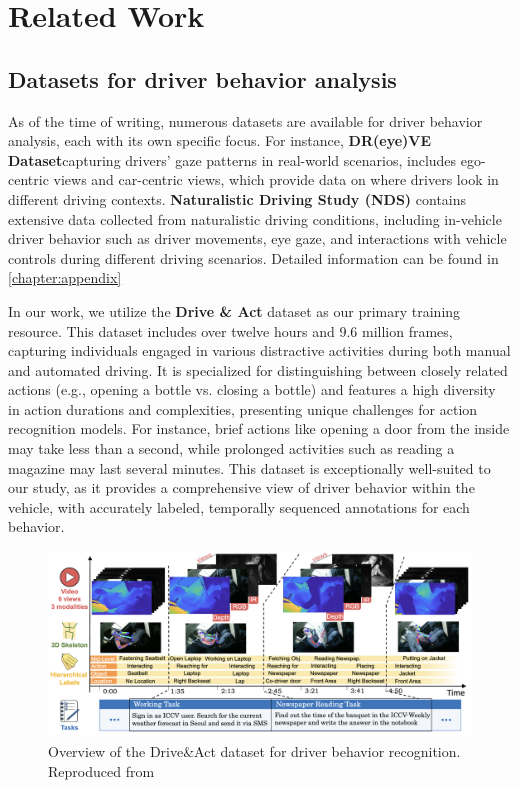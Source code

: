 \chapter{Related Work}\label{chapter:relatedwork}

\section{Datasets for driver behavior analysis}

As of the time of writing, numerous datasets are available for driver behavior analysis, each with its own specific focus. For instance, \textbf{DR(eye)VE Dataset}\cite{palazzi2018predicting}capturing drivers' gaze patterns in real-world scenarios, includes ego-centric views and car-centric views, which provide data on where drivers look in different driving contexts. \textbf{Naturalistic Driving Study (NDS)}\cite{regan2012naturalistic} contains extensive data collected from naturalistic driving conditions, including in-vehicle driver behavior such as driver movements, eye gaze, and interactions with vehicle controls during different driving scenarios. Detailed information can be found in \ref{chapter:appendix}


In our work, we utilize the \textbf{Drive \& Act} dataset\cite{9009583} as our primary training resource. This dataset includes over twelve hours and 9.6 million frames, capturing individuals engaged in various distractive activities during both manual and automated driving. It is specialized for distinguishing between closely related actions (e.g., opening a bottle vs. closing a bottle) and features a high diversity in action durations and complexities, presenting unique challenges for action recognition models. For instance, brief actions like opening a door from the inside may take less than a second, while prolonged activities such as reading a magazine may last several minutes. This dataset is exceptionally well-suited to our study, as it provides a comprehensive view of driver behavior within the vehicle, with accurately labeled, temporally sequenced annotations for each behavior.


\begin{figure}
    \centering
    \includegraphics[width=0.8\linewidth]{figures/03_DriveAct.png}
    \caption{Overview of the Drive\&Act dataset for driver behavior recognition. Reproduced from\cite{9009583}}
    \label{fig:DriveAct}
\end{figure}

